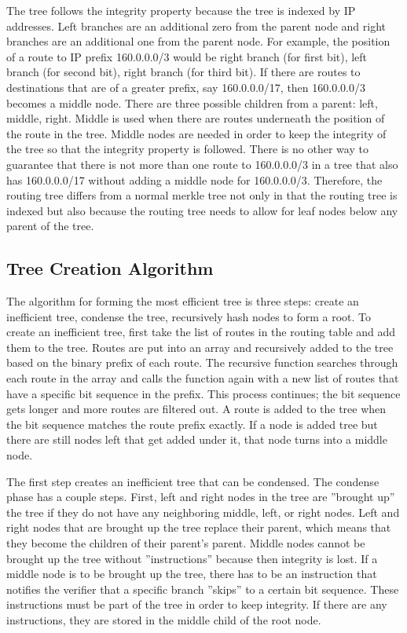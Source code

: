 \documentclass[letterpaper, 10 pt, conference]{ieeeconf}  %
\begin{document}
The tree follows the integrity property because the tree is indexed by IP addresses. Left branches are an additional zero from the parent node and right branches are an additional one from the parent node. For example, the position of a route to IP prefix 160.0.0.0/3 would be right branch (for first bit), left branch (for second bit), right branch (for third bit). If there are routes to destinations that are of a greater prefix, say 160.0.0.0/17, then 160.0.0.0/3 becomes a middle node. There are three possible children from a parent: left, middle, right. Middle is used when there are routes underneath the position of the route in the tree. Middle nodes are needed in order to keep the integrity of the tree so that the integrity property is followed. There is no other way to guarantee that there is not more than one route to 160.0.0.0/3 in a tree that also has 160.0.0.0/17 without adding a middle node for 160.0.0.0/3. Therefore, the routing tree differs from a normal merkle tree not only in that the routing tree is indexed but also because the routing tree needs to allow for leaf nodes below any parent of the tree. 

\subsection{Tree Creation Algorithm}

The algorithm for forming the most efficient tree is three steps: create an inefficient tree, condense the tree, recursively hash nodes to form a root. To create an inefficient tree, first take the list of routes in the routing table and add them to the tree. Routes are put into an array and recursively added to the tree based on the binary prefix of each route. The recursive function searches through each route in the array and calls the function again with a new list of routes that have a specific bit sequence in the prefix. This process continues; the bit sequence gets longer and more routes are filtered out. A route is added to the tree when the bit sequence matches the route prefix exactly. If a node is added tree but there are still nodes left that get added under it, that node turns into a middle node. 

The first step creates an inefficient tree that can be condensed. The condense phase has a couple steps. First, left and right nodes in the tree are ”brought up” the tree if they do not have any neighboring middle, left, or right nodes. Left and right nodes that are brought up the tree replace their parent, which means that they become the children of their parent’s parent. Middle nodes cannot be brought up the tree without ”instructions” because then integrity is lost. If a middle node is to be brought up the tree, there has to be an instruction that notifies the verifier that a specific branch ”skips” to a certain bit sequence. These instructions must be part of the tree in order to keep integrity. If there are any instructions, they are stored in the middle child of the root node. 
\end{document}

